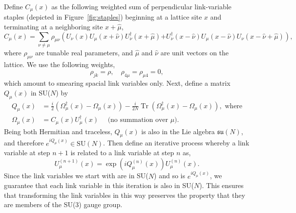     Define $C_\mu(x)$ as the following weighted sum of perpendicular link-variable staples (depicted in Figure~\ref{fig:staples}) beginning at a lattice site $x$ and terminating at a neighboring site $x + \hat\mu$,
    \begin{equation}\label{eq:staples}
        C_{\mu}(x)= \sum_{\nu \neq \mu} \rho_{\mu \nu}\left(U_{\nu}(x) U_{\mu}(x+\hat{\nu}) U_{\nu}^{\dagger}(x+\hat{\mu})\right.\left.+U_{\nu}^{\dagger}(x-\hat{\nu}) U_{\mu}(x-\hat{\nu}) U_{\nu}(x-\hat{\nu}+\hat{\mu})\right),
    \end{equation}
    where $\rho_{\mu\nu}$ are tunable real parameters, and $\hat\mu$ and $\hat\nu$ are unit vectors on the lattice. We use the following weights,
    \begin{equation}
        \rho_{j k}=\rho, \quad \rho_{4 \mu}=\rho_{\mu 4}=0,
    \end{equation}
    which amount to smearing spacial link variables only.
    Next, define a matrix $Q_\mu(x)$ in SU($N$) by
    \begin{equation}
        \begin{aligned}
            Q_{\mu}(x)&=\frac{i}{2}\left(\Omega_{\mu}^{\dagger}(x)-\Omega_{\mu}(x)\right)-\frac{i}{2 N} \operatorname{Tr}\left(\Omega_{\mu}^{\dagger}(x)-\Omega_{\mu}(x)\right), \text{ where}\\
            \Omega_{\mu}(x)&=C_{\mu}(x) U_{\mu}^{\dagger}(x)  \quad \text { (no summation over } \mu).
        \end{aligned}
    \end{equation}
    Being both Hermitian and traceless, $Q_\mu(x)$ is also in the Lie algebra $\mathfrak{su}(N)$, and therefore $e^{iQ_\mu(x)} \in \mathrm{SU}(N)$. Then define an iterative process whereby a link variable at step $n + 1$ is related to a link variable at step $n$ as,
    \begin{equation}
        U_{\mu}^{(n+1)}(x)=\exp \left(i Q_{\mu}^{(n)}(x)\right) U_{\mu}^{(n)}(x).
    \end{equation}
    Since the link variables we start with are in SU($N$) and so is $e^{iQ_\mu(x)}$, we guarantee that each link variable in this iteration is also in SU($N$). This ensures that transforming the link variables in this way preserves the property that they are members of the SU(3) gauge group.

